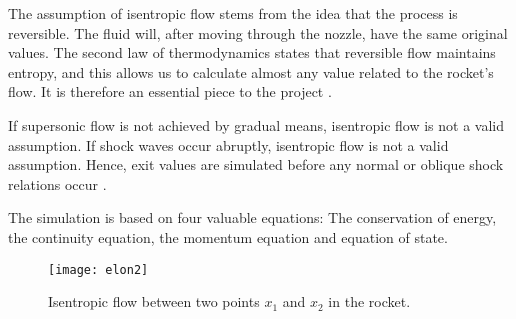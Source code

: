 	The assumption of isentropic flow stems from the idea that the process is reversible. The fluid will, after moving through the nozzle, have the same original values. The second law of thermodynamics states that reversible flow maintains entropy, and this allows us to calculate almost any value related to the rocket's flow. It is therefore an essential piece to the project \cite{nakkanozz}.

	If supersonic flow is not achieved by gradual means, isentropic flow is not a valid assumption. If shock waves occur abruptly, isentropic flow is not a valid assumption. Hence, exit values are simulated before any normal or oblique shock relations occur \cite{nasaisentrop}.

	The simulation is based on four valuable equations: The conservation of energy, the continuity equation, the momentum equation and equation of state.

	\begin{figure}
		\texttt{[image: elon2]}
		\caption{Isentropic flow between two points $x_1$ and $x_2$ in the rocket.}
		\label{fig:isentropicflow}
	\end{figure}


